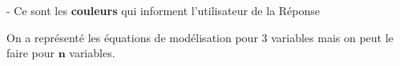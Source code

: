 \documentclass[10pt]{article}
\begin{document}
- Ce sont les \textbf{couleurs} qui informent l'utilisateur de la Réponse

\vspace{2cm}


\color{red}\danger\color{black} On a représenté les équations de modélisation pour 3 variables mais on peut le faire pour $\mathbf{n}$ variables.












        








\end{document}
